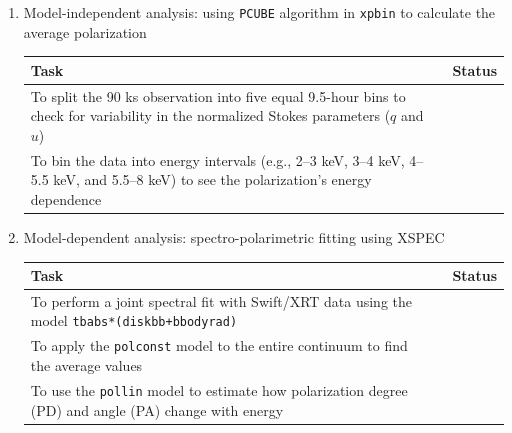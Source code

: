 \begin{enumerate}
		\newpage
		\item Model-independent analysis: using \verb|PCUBE| algorithm in \verb|xpbin| to calculate the average polarization
		\begin{table}[h!]
			\centering
			\begin{tabular}{p{}cc}
				\toprule
				\textbf{Task} && \textbf{Status} \\
				\toprule
				{\pt{}To split the 90 ks observation into five equal 9.5-hour bins to check for variability in the normalized Stokes parameters ($q$ and $u$)} && {} \\
				{\pt{}To bin the data into energy intervals (e.g., 2--3 keV, 3--4 keV, 4--5.5 keV, and 5.5--8 keV) to see the polarization's energy dependence} && {} \\
				\bottomrule
			\end{tabular}
		\end{table}
		
		\item Model-dependent analysis: spectro-polarimetric fitting using XSPEC
		\begin{table}[h!]
			\centering
			\begin{tabular}{p{}cc}
				\toprule
				\textbf{Task} && \textbf{Status} \\
				\toprule
				{\pt{}To perform a joint spectral fit with Swift/XRT data using the model \verb|tbabs*(diskbb+bbodyrad)|} && {} \\
				{\pt{}To apply the \verb|polconst| model to the entire continuum to find the average values} && {} \\
				{\pt{}To use the \verb|pollin| model to estimate how polarization degree (PD) and angle (PA) change with energy} && {} \\
				\bottomrule
			\end{tabular}
		\end{table}
	\end{enumerate}